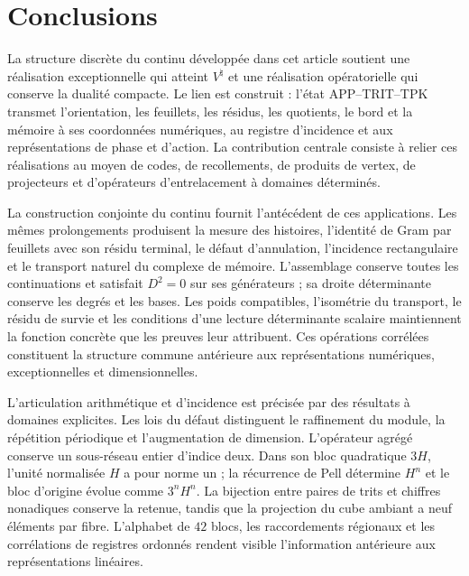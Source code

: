 \section{Conclusions}
\label{iv:conclusiones}
\begingroup
\setlength{\parskip}{0pt}
\setlength{\abovedisplayskip}{5pt}
\setlength{\belowdisplayskip}{5pt}

La structure discrète du continu développée dans cet article
soutient une réalisation exceptionnelle qui atteint \(V^\natural\) et
une réalisation opératorielle qui conserve la dualité compacte.
Le lien est construit : l’état APP--TRIT--TPK transmet
l’orientation, les feuillets, les résidus, les quotients, le bord et la mémoire à ses
coordonnées numériques, au registre d’incidence et aux représentations
de phase et d’action. La contribution centrale consiste à relier ces
réalisations au moyen de codes, de recollements, de produits de vertex,
de projecteurs et d’opérateurs d’entrelacement à domaines déterminés.

La construction conjointe du continu fournit l’antécédent de
ces applications. Les mêmes prolongements produisent la mesure des
histoires, l’identité de Gram par feuillets avec son résidu terminal,
le défaut d’annulation, l’incidence rectangulaire et le transport
naturel du complexe de mémoire. L’assemblage conserve toutes les
continuations et satisfait \(D^2=0\) sur ses générateurs ; sa droite
déterminante conserve les degrés et les bases. Les poids compatibles,
l’isométrie du transport, le résidu de survie et les conditions
d’une lecture déterminante scalaire maintiennent la fonction concrète que
les preuves leur attribuent. Ces opérations corrélées constituent
la structure commune antérieure aux représentations numériques,
exceptionnelles et dimensionnelles.

L’articulation arithmétique et d’incidence est précisée par des résultats
à domaines explicites. Les lois du défaut distinguent le raffinement
du module, la répétition périodique et l’augmentation de dimension. L’opérateur
agrégé conserve un sous-réseau entier d’indice deux. Dans son bloc
quadratique \(3H\), l’unité normalisée \(H\) a pour norme un ; la
récurrence de Pell détermine \(H^n\) et le bloc d’origine évolue
comme \(3^nH^n\).
La bijection entre paires de trits et chiffres nonadiques conserve la retenue,
tandis que la projection du cube ambiant a neuf éléments par fibre.
L’alphabet de \(42\) blocs, les raccordements régionaux et les corrélations
de registres ordonnés rendent visible l’information antérieure aux
représentations linéaires.

